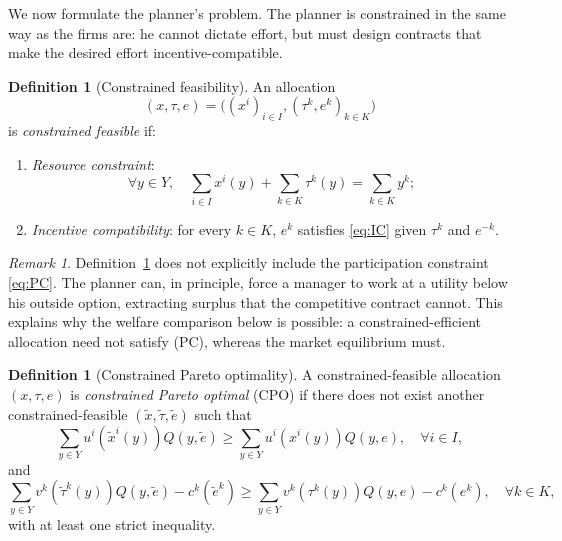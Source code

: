 \documentclass[11pt,a4paper,oneside]{book}
\def\geq{\geqslant}
\theoremstyle{plain}
\theoremstyle{definition}
\newtheorem{definition}[theorem]{Definition}
\theoremstyle{remark}
\newtheorem{remark}[theorem]{Remark}
\numberwithin{equation}{chapter}
\begin{document}
We now formulate the planner's problem.
The planner is constrained in the same way as the firms are: he cannot dictate effort, but must design contracts that make the desired effort incentive-compatible.

\begin{definition}[Constrained feasibility]\label{def:MQ08-feasibility}
An allocation
\begin{equation*}
  (x, \tau, e) = \bigl( (x^i)_{i \in I}, (\tau^k, e^k)_{k \in K} \bigr)
\end{equation*}
is \emph{constrained feasible} if:
\begin{enumerate}
  \item[\textup{(i)}] \emph{Resource constraint}:
  \begin{equation*}
    \forall y \in Y, \quad \sum_{i \in I} x^i(y) + \sum_{k \in K} \tau^k(y) = \sum_{k \in K} y^k;
  \end{equation*}
  \item[\textup{(ii)}] \emph{Incentive compatibility}: for every $k \in K$, $e^k$ satisfies \eqref{eq:IC} given $\tau^k$ and $e^{-k}$.
\end{enumerate}
\end{definition}

\begin{remark}\label{rem:no-PC}
Definition~\ref{def:MQ08-feasibility} does not explicitly include the participation constraint \eqref{eq:PC}.
The planner can, in principle, force a manager to work at a utility below his outside option, extracting surplus that the competitive contract cannot.
This explains why the welfare comparison below is possible: a constrained-efficient allocation need not satisfy (PC), whereas the market equilibrium must.
\end{remark}

\begin{definition}[Constrained Pareto optimality]\label{def:MQ08-CPO}
A constrained-feasible allocation $(x, \tau, e)$ is \emph{constrained Pareto optimal} (CPO) if there does not exist another constrained-feasible $(\widetilde{x}, \widetilde{\tau}, \widetilde{e})$ such that
\begin{equation*}
  \sum_{y \in Y} u^i(\widetilde{x}^i(y)) Q(y, \widetilde{e}) \geq \sum_{y \in Y} u^i(x^i(y)) Q(y, e), \quad \forall i \in I,
\end{equation*}
and
\begin{equation*}
  \sum_{y \in Y} v^k(\widetilde{\tau}^k(y)) Q(y, \widetilde{e}) - c^k(\widetilde{e}^k)
  \geq \sum_{y \in Y} v^k(\tau^k(y)) Q(y, e) - c^k(e^k), \quad \forall k \in K,
\end{equation*}
with at least one strict inequality.
\end{definition}
\end{document}

